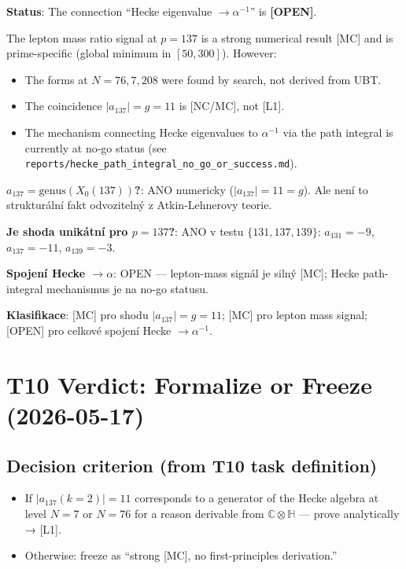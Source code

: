 \documentclass[12pt,a4paper]{article}
\theoremstyle{definition}
\theoremstyle{remark}
\begin{document}
\begin{warnbox}
\textbf{Status}: The connection ``Hecke eigenvalue $\to \alpha^{-1}$'' is
\textbf{[OPEN]}.

The lepton mass ratio signal at $p=137$ is a strong numerical result [MC]
and is prime-specific (global minimum in $[50,300]$).  However:
\begin{itemize}
  \item The forms at $N=76, 7, 208$ were found by search, not derived from UBT.
  \item The coincidence $|a_{137}|=g=11$ is [NC/MC], not [L1].
  \item The mechanism connecting Hecke eigenvalues to $\alpha^{-1}$ via
        the path integral is currently at no-go status (see
        \texttt{reports/hecke\_path\_integral\_no\_go\_or\_success.md}).
\end{itemize}
\end{warnbox}

\begin{statusbox}
\textbf{$a_{137} = \mathrm{genus}(X_0(137))$?}: ANO numericky ($|a_{137}|=11=g$).
Ale není to strukturální fakt odvozitelný z Atkin-Lehnerovy teorie.

\textbf{Je shoda unikátní pro $p=137$?}: ANO v testu $\{131,137,139\}$:
$a_{131}=-9$, $a_{137}=-11$, $a_{139}=-3$.

\textbf{Spojení Hecke $\to \alpha$}: OPEN — lepton-mass signál je silný [MC];
Hecke path-integral mechanismus je na no-go statusu.

\textbf{Klasifikace}: [MC] pro shodu $|a_{137}|=g=11$; [MC] pro lepton mass signal;
[OPEN] pro celkové spojení Hecke $\to \alpha^{-1}$.
\end{statusbox}

\section{T10 Verdict: Formalize or Freeze (2026-05-17)}
\label{sec:hecke:t10}

\subsection{Decision criterion (from T10 task definition)}

\begin{itemize}
  \item If $|a_{137}(k=2)| = 11$ corresponds to a generator of the Hecke
    algebra at level $N=7$ or $N=76$ for a reason derivable from
    $\mathbb{C}\otimes\mathbb{H}$ — prove analytically → [L1].
  \item Otherwise: freeze as ``strong [MC], no first-principles derivation.''
\end{itemize}
\end{document}
